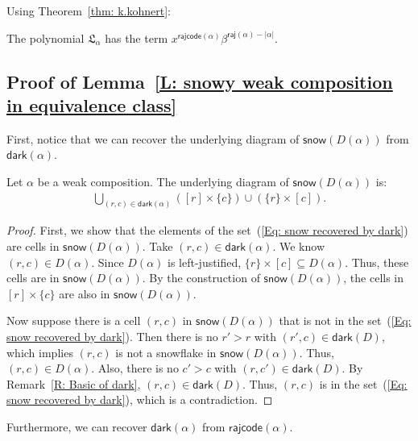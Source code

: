 \documentclass[ALCO]{cedram}
\newenvironment{manuallemma}[1]{
  \renewcommand\themanuallemmainner{#1}
  \manuallemmainner
}{\endmanuallemmainner}
\newcommand{\fL}{\mathfrak{L}}
\newcommand{\fLb}{\fL}
\newcommand{\dark}{\mathsf{dark}}
\newcommand{\snow}{\mathsf{snow}}
\newcommand{\rajcode}{\mathsf{rajcode}}
\newcommand{\raj}{\mathsf{raj}}
\begin{document}
Using Theorem~\ref{thm: k.kohnert}:

\begin{manuallemma}{\ref{L: Top Las 1}}
The polynomial $\fLb_\alpha$ has the term $x^{\rajcode(\alpha)} \beta^{\raj(\alpha) - |\alpha|}$.
\end{manuallemma} 

\subsection{Proof of Lemma~\ref{L: snowy weak composition in equivalence class}}
\label{SS: equivalence}

First, notice that we can recover the underlying diagram of $\snow(D(\alpha))$
from $\dark(\alpha)$.

\begin{lemma}
\label{L: dark recovers snow}
Let $\alpha$ be a weak composition. 
The underlying diagram of $\snow(D(\alpha))$
is:
\begin{align}
\label{Eq: snow recovered by dark}
\bigcup_{(r,c) \in \dark(\alpha)} ([r] \times \{c\}) \cup (\{r\} \times [c]).
\end{align}
\end{lemma}
\begin{proof}
First, we show that the elements of the set~(\ref{Eq: snow recovered by dark})
are cells in $\snow(D(\alpha))$.
Take $(r,c) \in \dark(\alpha)$.
We know $(r,c) \in D(\alpha)$.
Since $D(\alpha)$ is left-justified, 
$\{r\} \times [c] \subseteq D(\alpha)$.
Thus, these cells are in $\snow(D(\alpha))$.
By the construction of $\snow(D(\alpha))$,
the cells in~$[r] \times \{c\}$ are also 
in $\snow(D(\alpha))$.

Now suppose there is a cell $(r, c)$ 
in $\snow(D(\alpha))$
that is not in the 
set~(\ref{Eq: snow recovered by dark}).
Then there is no $r' > r$ with $(r', c) \in \dark(D)$,
which implies $(r,c)$ is not a snowflake 
in $\snow(D(\alpha))$.
Thus, $(r,c) \in D(\alpha)$.
Also, there is no $c' > c$ with $(r, c') \in \dark(D)$.
By Remark~\ref{R: Basic of dark},
$(r,c) \in \dark(D)$.
Thus, $(r, c)$ is in the 
set~(\ref{Eq: snow recovered by dark}),
which is a contradiction.
\end{proof}

Furthermore, 
we can recover $\dark(\alpha)$ from $\rajcode(\alpha)$.
\end{document}
